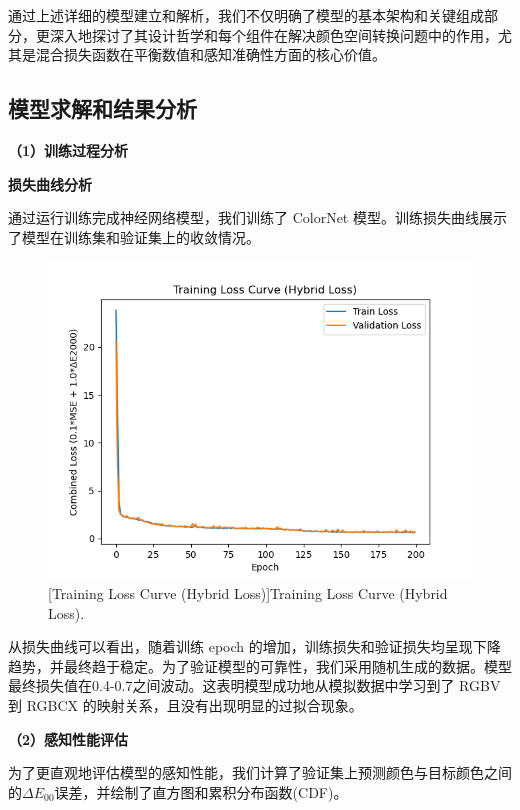 通过上述详细的模型建立和解析，我们不仅明确了模型的基本架构和关键组成部分，更深入地探讨了其设计哲学和每个组件在解决颜色空间转换问题中的作用，尤其是混合损失函数在平衡数值和感知准确性方面的核心价值。

\subsection[\hspace{-2pt}模型求解和结果分析]{{\heiti{} \hspace{-8pt}模型求解和结果分析}}\label{section2: 模型求解和结果分析}

\noindent\textbf{（1）训练过程分析}

 \textbf{损失曲线分析}

通过运行训练完成神经网络模型，我们训练了 ColorNet 模型。训练损失曲线展示了模型在训练集和验证集上的收敛情况。

\begin{figure}[H]
\centering
{}
\includegraphics[width=0.8\columnwidth]{figures/Training_Loss_Curve.png}
[Training Loss Curve (Hybrid Loss)]{Training Loss Curve (Hybrid Loss).}
\label{figure2: loss_curve}
\end{figure}

从损失曲线可以看出，随着训练 epoch 的增加，训练损失和验证损失均呈现下降趋势，并最终趋于稳定。为了验证模型的可靠性，我们采用随机生成的数据。模型最终损失值在0.4-0.7之间波动。这表明模型成功地从模拟数据中学习到了 RGBV 到 RGBCX 的映射关系，且没有出现明显的过拟合现象。

\noindent\textbf{（2）感知性能评估}

为了更直观地评估模型的感知性能，我们计算了验证集上预测颜色与目标颜色之间的$\Delta E_{00}$误差，并绘制了直方图和累积分布函数(CDF)。

